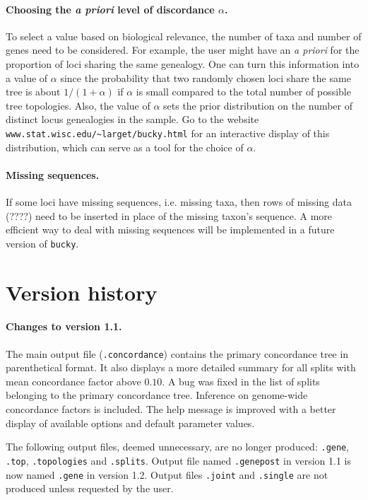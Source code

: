 \documentclass[12pt,english,final,letterpaper]{article}
\begin{document}
\paragraph{Choosing the {\it a priori} level of discordance $\alpha$.}
To select a value based on biological relevance, the number of taxa and 
number of genes need to be considered. For example, the user might have an 
{\it a priori} for the proportion of loci sharing the same genealogy. One 
can turn this information into a value of $\alpha$ since the probability that 
two randomly chosen loci share the same tree is about $1/(1+\alpha)$ if 
$\alpha$ is small compared to the total number of possible tree topologies. 
Also, the value of $\alpha$ sets the prior distribution on the number of 
distinct locus genealogies in the sample. 
Go to the website \verb+www.stat.wisc.edu/~larget/bucky.html+ 
for an interactive display of this distribution, which can
serve as a tool for the choice of $\alpha$. 


\paragraph{Missing sequences.}
If some loci have missing sequences, i.e. missing taxa, then
rows of missing data (????) need to be inserted in place of the missing 
taxon's sequence. A more efficient way to deal with missing 
sequences will be implemented in a future version of {\tt bucky}.

    
\section{Version history}
\paragraph{Changes to version 1.1.}
The main output file ({\tt .concordance}) contains the primary concordance
tree in parenthetical format. It also displays a more detailed summary
for all splits with mean concordance factor above $0.10$. 
A bug was fixed in the list of splits belonging to the
primary concordance tree. Inference on genome-wide concordance factors is
included.
The help message is improved with a better display of available options and
default parameter values.

\smallskip

The following output files, deemed unnecessary, are no longer produced:
{\tt .gene}, {\tt .top}, {\tt .topologies} and {\tt .splits}. 
Output file named {\tt .genepost} in version 1.1 is now named 
{\tt .gene} in version 1.2. 
Output files {\tt .joint} and {\tt .single} are not produced unless
requested by the user.
\end{document}
